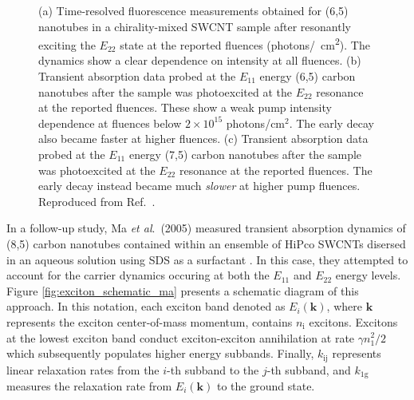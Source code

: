 \begin{figure}[H]
	\caption{(a) Time-resolved fluorescence measurements obtained for (6,5) nanotubes in a chirality-mixed SWCNT sample after resonantly exciting the $E_{22}$ state at the reported fluences (photons\si{/\cm \squared}). The dynamics show a clear dependence on intensity at all fluences. (b) Transient absorption data probed at the $E_{11}$ energy (6,5) carbon nanotubes after the sample was photoexcited at the $E_{22}$ resonance at the reported fluences. These show a weak pump intensity dependence at fluences below $2 \times 10^{15}$ photons/cm$^2$. The early decay also became faster at higher fluences. (c) Transient absorption data probed at the $E_{11}$ energy (7,5) carbon nanotubes after the sample was photoexcited at the $E_{22}$ resonance at the reported fluences. The early decay instead became much \textit{slower} at higher pump fluences. Reproduced from Ref.\ \cite{ma2004ultrafast}.}
	\label{fig:fluorescence_abs_ma_2004}
\end{figure}

In a follow-up study, Ma \textit{et al}.\ (2005) measured transient absorption dynamics of (8,5) carbon nanotubes contained within an ensemble of HiPco SWCNTs disersed in an aqueous solution using SDS as a surfactant \cite{ma2005femtosecond}. In this case, they attempted to account for the carrier dynamics occuring at both the $E_{11}$ and $E_{22}$ energy levels. Figure \ref{fig:exciton_schematic_ma} presents a schematic diagram of this approach. In this notation, each exciton band denoted as $E_i(\mathbf{k})$, where $\mathbf{k}$ represents the exciton center-of-mass momentum, contains $n_\text{i}$ excitons. Excitons at the lowest exciton band conduct exciton-exciton annihilation at rate $\gamma n_1^2/2$ which subsequently populates higher energy subbands. Finally, $k_\text{ij}$ represents linear relaxation rates from the $i$-th subband to the $j$-th subband, and $k_\text{1g}$ measures the relaxation rate from $E_i(\mathbf{k})$ to the ground state.

